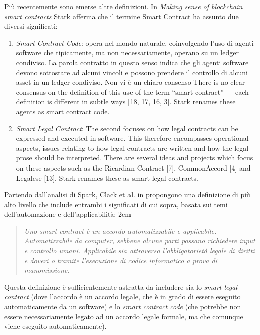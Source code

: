 Più recentemente sono emerse altre definizioni.
In \textit{Making sense of blockchain smart contracts} \cite{making-sense-of-bsc}
Stark afferma che il termine Smart Contract ha assunto due diversi significati:
\begin{enumerate}
	\item \textit{Smart Contract Code}: opera nel mondo naturale,
	      coinvolgendo l'uso di agenti software che tipicamente,
	      ma non necessariamente, operano su un ledger condiviso. La parola contratto in questo senso
	      indica che gli agenti software devono sottostare ad alcuni vincoli e possono prendere il controllo
	      di alcuni asset in un ledger condiviso. Non vi è un chiaro consenso  There is no clear consensus on the
	      definition of this use of the term “smart contract” — each definition is different in subtle
	      ways [18, 17, 16, 3]. Stark renames these agents as smart contract code.
	\item \textit{Smart Legal Contract}: The second focuses on how legal contracts can be expressed and executed in software.
	      This therefore encompasses operational aspects, issues relating to how legal contracts
	      are written and how the legal prose should be interpreted. There are several ideas and
	      projects which focus on these aspects such as the Ricardian Contract [7], CommonAccord
		      [4] and Legalese [13]. Stark renames these as smart legal contracts.
\end{enumerate}
Partendo dall'analisi di Spark, Clack et al. in \cite{Clack2016SmartCT} propongono una definizione
di più alto livello che include entrambi i significati di cui sopra, basata sui temi
dell'automazione e dell'applicabilità:
\begingroup
\advance\leftmargini 2em
\begin{quote}
	{
		{\em Uno smart contract è un accordo automatizzabile e applicabile. Automatizzabile da computer,
				sebbene alcune parti possano richiedere input e controllo umani. Applicabile sia attraverso
				l'obbligatorietà legale di diritti e doveri o tramite
				l'esecuzione di codice informatico a prova di manomissione.}
	}
\end{quote}
\endgroup
Questa definizione è sufficientemente astratta da includere sia lo \textit{smart legal contract}
(dove l'accordo è un accordo legale, che è in grado di essere eseguito automaticamente da un software)
e lo \textit{smart contract code} (che potrebbe non essere necessariamente legato ad un accordo legale formale,
ma che comunque viene eseguito automaticamente).



